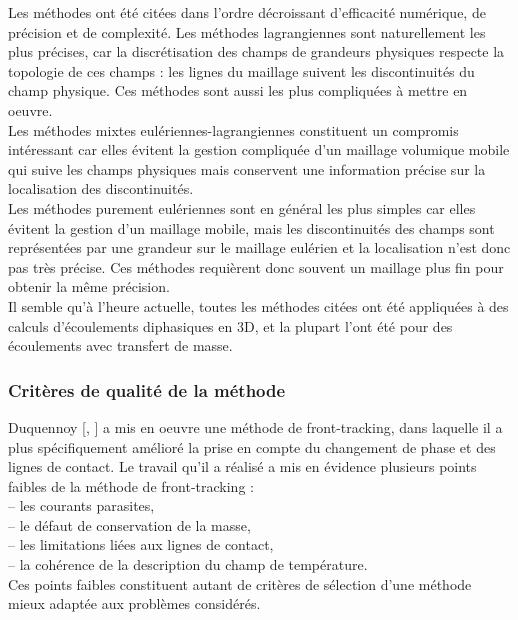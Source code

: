 Les m\'ethodes ont \'et\'e cit\'ees dans l’ordre d\'ecroissant d’efficacit\'e num\'erique, de pr\'ecision et de complexit\'e. Les m\'ethodes lagrangiennes sont naturellement les plus pr\'ecises, car la discr\'etisation des champs de grandeurs physiques respecte la topologie de ces champs : les lignes du maillage suivent les discontinuit\'es du champ physique. Ces m\'ethodes sont aussi les plus compliqu\'ees à mettre en oeuvre.\\
Les m\'ethodes mixtes eul\'eriennes-lagrangiennes constituent un compromis int\'eressant car elles \'evitent la gestion compliqu\'ee d’un maillage volumique mobile qui suive les champs physiques mais conservent une information pr\'ecise sur la localisation des discontinuit\'es.\\
Les m\'ethodes purement eul\'eriennes sont en g\'en\'eral les plus simples car elles \'evitent la gestion d’un maillage mobile, mais les discontinuit\'es des champs sont repr\'esent\'ees par une grandeur sur le maillage eul\'erien et la localisation n’est donc pas très pr\'ecise. Ces m\'ethodes requi\`erent donc souvent un maillage plus fin pour obtenir la même pr\'ecision.\\
Il semble qu’\`a l’heure actuelle, toutes les m\'ethodes cit\'ees ont \'et\'e appliqu\'ees \`a des calculs d’\'ecoulements diphasiques en 3D, et la plupart l’ont \'et\'e pour des \'ecoulements avec transfert de masse.

\subsubsection{Critères de qualit\'e de la m\'ethode}
Duquennoy [\cite{Duquennoy2000}, \cite{Duquennoy2000_2}] a mis en oeuvre une m\'ethode de front-tracking, dans laquelle il a plus sp\'ecifiquement am\'elior\'e la prise en compte du changement de phase et des lignes de contact. Le travail qu’il a r\'ealis\'e a mis en \'evidence plusieurs points faibles de la m\'ethode de front-tracking :\\
– les courants parasites,\\
– le d\'efaut de conservation de la masse,\\
– les limitations li\'ees aux lignes de contact,\\
– la coh\'erence de la description du champ de temp\'erature.\\
Ces points faibles constituent autant de crit\`eres de s\'election d’une m\'ethode
mieux adapt\'ee aux problèmes consid\'er\'es.\smallskip \\

